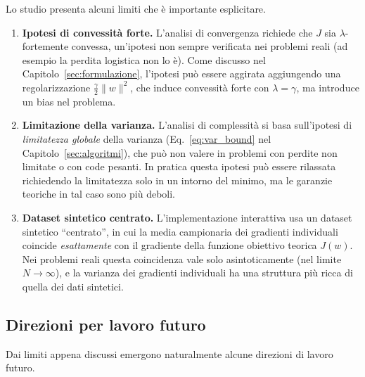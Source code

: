 \documentclass[a4paper,12pt]{article}
\numberwithin{equation}{section}
\numberwithin{figure}{section}
\numberwithin{table}{section}
\begin{document}
Lo studio presenta alcuni limiti che è importante esplicitare.

\begin{enumerate}
  \item \textbf{Ipotesi di convessità forte.} L'analisi di convergenza richiede
  che $J$ sia $\lambda$-fortemente convessa, un'ipotesi non sempre verificata
  nei problemi reali (ad esempio la perdita logistica non lo è). Come discusso
  nel Capitolo~\ref{sec:formulazione}, l'ipotesi può essere aggirata
  aggiungendo una regolarizzazione $\frac{\gamma}{2}\|w\|^2$, che induce
  convessità forte con $\lambda = \gamma$, ma introduce un bias nel problema.
  \item \textbf{Limitazione della varianza.} L'analisi di complessità si basa
  sull'ipotesi di \emph{limitatezza globale} della varianza
  (Eq.~\eqref{eq:var_bound} nel Capitolo~\ref{sec:algoritmi}), che può non
  valere in problemi con perdite non limitate o con code pesanti. In pratica
  questa ipotesi può essere rilassata richiedendo la limitatezza solo in un
  intorno del minimo, ma le garanzie teoriche in tal caso sono più deboli.
  \item \textbf{Dataset sintetico centrato.} L'implementazione interattiva usa
  un dataset sintetico ``centrato'', in cui la media campionaria dei gradienti
  individuali coincide \emph{esattamente} con il gradiente della funzione
  obiettivo teorica $J(w)$. Nei problemi reali questa coincidenza vale solo
  asintoticamente (nel limite $N \to \infty$), e la varianza dei gradienti
  individuali ha una struttura più ricca di quella dei dati sintetici.
\end{enumerate}

\subsection{Direzioni per lavoro futuro}

Dai limiti appena discussi emergono naturalmente alcune direzioni di lavoro
futuro.
\end{document}
